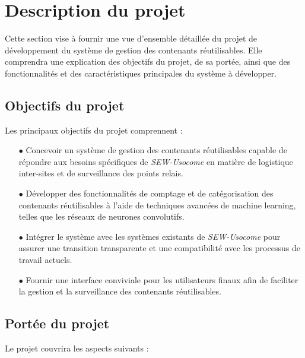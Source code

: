 \section{Description du projet}

Cette section vise à fournir une vue d'ensemble détaillée du projet de développement du système de gestion des contenants réutilisables. Elle comprendra une explication des objectifs du projet, de sa portée, ainsi que des fonctionnalités et des caractéristiques principales du système à développer.

\subsection{Objectifs du projet}

Les principaux objectifs du projet comprennent :\\

\begin{itemize}
    \item[$\bullet$] Concevoir un système de gestion des contenants réutilisables capable de répondre aux besoins spécifiques de \emph{SEW-Usocome} en matière de logistique inter-sites et de surveillance des points relais.
    \item[$\bullet$] Développer des fonctionnalités de comptage et de catégorisation des contenants réutilisables à l'aide de techniques avancées de machine learning, telles que les réseaux de neurones convolutifs.
    \item[$\bullet$] Intégrer le système avec les systèmes existants de \emph{SEW-Usocome} pour assurer une transition transparente et une compatibilité avec les processus de travail actuels.
    \item[$\bullet$] Fournir une interface conviviale pour les utilisateurs finaux afin de faciliter la gestion et la surveillance des contenants réutilisables.
\end{itemize}

\subsection{Portée du projet}

Le projet couvrira les aspects suivants :\\

